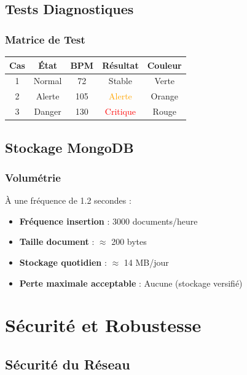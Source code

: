 \documentclass[12pt,french]{report}
\begin{document}
\section{Tests Diagnostiques}

\subsection{Matrice de Test}

\begin{table}[h]
\centering
\begin{tabular}{|c|c|c|c|c|}
\hline
\textbf{Cas} & \textbf{État} & \textbf{BPM} & \textbf{Résultat} & \textbf{Couleur} \\
\hline
1 & Normal & 72 & \textcolor{medgreen}{Stable} & Verte \\
2 & Alerte & 105 & \textcolor{orange}{Alerte} & Orange \\
3 & Danger & 130 & \textcolor{red}{Critique} & Rouge \\
\hline
\end{tabular}
\end{table}

\section{Stockage MongoDB}

\subsection{Volumétrie}

À une fréquence de 1.2 secondes :
\begin{itemize}
    \item \textbf{Fréquence insertion} : 3000 documents/heure
    \item \textbf{Taille document} : $\approx$ 200 bytes
    \item \textbf{Stockage quotidien} : $\approx$ 14 MB/jour
    \item \textbf{Perte maximale acceptable} : Aucune (stockage versifié)
\end{itemize}

\chapter{Sécurité et Robustesse}

\section{Sécurité du Réseau}
\end{document}
